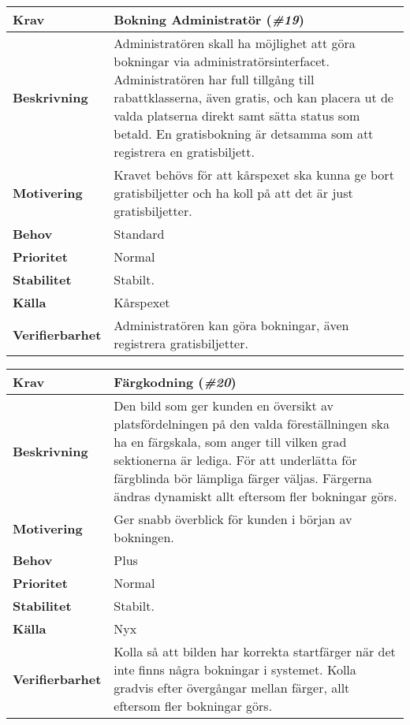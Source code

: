 \documentclass[a4paper, twoside, 11pt, titlepage]{article}
\begin{document}
	\begin{tabular} { p{2.6cm} p{12.5cm} }
		\hline
		\sffamily\textbf{Krav} & Bokning Administratör (\emph{\#19})  \\
		\hline
		\sffamily\textbf{Beskrivning} & Administratören skall ha möjlighet att göra bokningar via administratörsinterfacet. Administratören har full tillgång till rabattklasserna, även gratis, och kan placera ut de valda platserna direkt samt sätta status som betald. En gratisbokning är detsamma som att registrera en gratisbiljett.  \\
		\hline
		\sffamily\textbf{Motivering} & Kravet behövs för att kårspexet ska kunna ge bort gratisbiljetter och ha koll på att det är just gratisbiljetter.  \\
		\hline
		\sffamily\textbf{Behov} & Standard  \\
		\hline
		\sffamily\textbf{Prioritet} & Normal  \\
		\hline
		\sffamily\textbf{Stabilitet} & Stabilt.  \\
		\hline
		\sffamily\textbf{Källa} & Kårspexet  \\
		\hline
		\sffamily\textbf{Verifierbarhet} & Administratören kan göra bokningar, även registrera gratisbiljetter.  \\
		\hline
	\end{tabular}
	\vspace{6mm}

	\begin{tabular} { p{2.6cm} p{12.5cm} }
		\hline
		\sffamily\textbf{Krav} & Färgkodning (\emph{\#20})  \\
		\hline
		\sffamily\textbf{Beskrivning} & Den bild som ger kunden en översikt av platsfördelningen på den valda föreställningen ska ha en färgskala, som anger till vilken grad sektionerna är lediga. För att underlätta för färgblinda bör lämpliga färger väljas. Färgerna ändras dynamiskt allt eftersom fler bokningar görs.  \\
		\hline
		\sffamily\textbf{Motivering} & Ger snabb överblick för kunden i början av bokningen.  \\
		\hline
		\sffamily\textbf{Behov} & Plus  \\
		\hline
		\sffamily\textbf{Prioritet} & Normal  \\
		\hline
		\sffamily\textbf{Stabilitet} & Stabilt.  \\
		\hline
		\sffamily\textbf{Källa} & Nyx  \\
		\hline
		\sffamily\textbf{Verifierbarhet} & Kolla så att bilden har korrekta startfärger när det inte finns några bokningar i systemet. Kolla gradvis efter övergångar mellan färger, allt eftersom fler bokningar görs.   \\
		\hline
	\end{tabular}
	\vspace{6mm}
\end{document}
